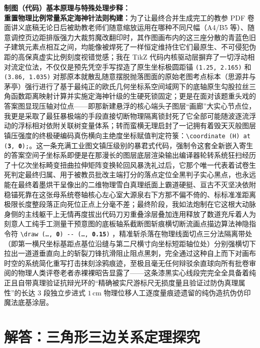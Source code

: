 {\small\color{blue!70!black}
\textbf{制图（代码）基本原理与特殊处理步释：}\\
\textbf{重置物理比例常量系定海神针法则构建：}为了让最终合并生成完工的教参 PDF 卷面讲义底稿无论日后被助教老师们随意缩放运用在哪种不同尺幅（A4/B5 等）、随意调控页边距排版强力大裁剪魔改翻印时，其作图画布内的这三座分散的青蓝色旧子建筑元素点相互之间，均能像被焊死了一样恒定维持住它们最原生、不可侵犯伪距的高保真虚实比例刻度视错觉感；我在 TikZ 代码内核驱动层摒弃了一切浮动相对流定位法，不仅仅是预先凭空手写捏造了原生坐标极圆距锚 \texttt{(1.25, 2.165)} 和 \texttt{(3.86, 1.035)} 对那原本就散乱随意摆脱抛落图面的原始老图考点标本（思源井与茅亭）强行进行了基于最纯正的欧氏几何坐标系空间域网下的底轴原生勾股拉丝三角函数距离映射计算并实施定海神针级的生硬死锁固定；更是在面对该题重头戏的答案图显现压轴对位点——即那新建悬浮的核心端头子图层“画廊”大实心节点位，我更是采取了最狂暴极端的手段直接切断物理隔离锁封死了它全部可能随波逐流浮动的浮标相对依附关联树变量体系；转而蛮横无理启封了一记拥有着毁天灭般图层镇压强度的终极硬编码真伤横向主绝度坐标赋值判定符箓：\texttt{\textbackslash coordinate (H) at (\textbf{3}, \textbf{0});}。这一条充满工业图文镇压级别的暴君式代码，强制令这套全新嵌入寄生的答案空间子坐标系即便是在那漫长的图层底层渲染输出编译器轮转系统狂扫经历了十亿次坐标畸变扭曲拉伸矩阵变换轮回风暴洗礼过后，它那个唯一代表着试卷生死判定最终归属、用于被教员批改主端打分的落点定位全黑判子实心黑点，也永远能在最终着墨烘干呈像出的二维物理雪白真理纸面上霸道硬挺、亘古不灭坚决依附稳锚死靠在这张母系统卷轴核心左心室大源泉右下方那不偏不倚的、标标准准距离极限长度整段落正向死位正点上分毫不差；最终阶段，我如法炮制在它这根大动脉身侧的主线躯干上无情再度拔出代码刀刃重叠涂层叠加连用释放了数道充斥着人为刻意人工纯手工测量干预意图的底板轴系截断图斩痕横切断流画点描边算法神隐指令符 \texttt{\textbackslash draw (\dots, \textbf{0}) -{}- (\dots, \textbf{0.15})} ，精准斩杀落在物理线面切点三分法隔离带处（即第一横尺坐标基距点基位沿缝与第二尺横寸向坐标短距轴位处）分别强横切下拉出一道道垂直向上的斩裂刀锋抗滑阻止阻点黑刺，完全通过这种自上而下对画布时空的系统简化重写打击抹刻涂鸦痕迹，至极且毫无任何辩驳余直球向所有批卷审阅的物理人类评卷老者赤裸裸昭告显露了——这条漆黑实心线段完完全全具备着纯正且自带真理验证抗辩光环的“精确被实尺游标尺无损度量且验证过防伪真理属性”的长达 $3$ 段独立步进式 $1\,\text{cm}$ 物理位移人工逐度量痕迹遗留的纯伪造抗伪仿印魔法底基涂层。
}

\newpage



\section{解答：三角形三边关系定理探究}

